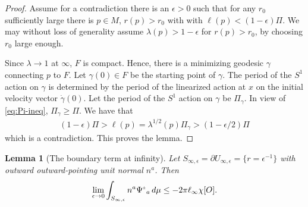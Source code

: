 \documentclass[a4paper,10pt,reqno]{amsart}
\theoremstyle{plain}
\newtheorem{lemma}[thm]{Lemma}
\newcommand{\PM}[1]{{{#1}^{\hspace{-.5pt}\scaleto{\pm}{3.5pt}}}}
\newcommand{\eps}{\epsilon}
\newcommand{\Fixed}{F}
\numberwithin{equation}{section}
\begin{document}
\begin{proof} 
Assume for a contradiction there is an $\eps > 0$ such that for any $r_0$ sufficiently large there is $p \in M$, $r(p) > r_0$ with with $\ell(p) < (1-\eps)\Pi$. We may without loss of generality assume $\lambda(p) > 1-\eps$ for $r(p) > r_0$, by choosing $r_0$ large enough. 

Since $\lambda \to 1$ at $\infty$, $\Fixed$ is compact. Hence, there is a minimizing geodesic $\gamma$ connecting $p$ to  $\Fixed$. Let $\gamma(0) \in \Fixed$ be the starting point of $\gamma$. The period of the $S^1$ action on $\gamma$ is determined by the period of the linearized action at $x$ on the initial velocity vector $\dot \gamma(0)$. Let the period of the $S^1$ action on $\gamma$ be $\Pi_\gamma$. In view of \eqref{eq:Pi-ineq}, $\Pi_\gamma \geq \Pi$. We have that 
\begin{align} 
(1-\eps) \Pi > \ell(p) =\lambda^{1/2}(p) \Pi_\gamma > (1-\eps/2)\Pi
\end{align} 
which is a contradiction. This proves the lemma.
\end{proof} 

\begin{lemma}[The boundary term at infinity] \label{lem:bdrinfty} 
Let $S_{\infty,\epsilon} = \partial U_{\infty,\epsilon} = \{ r = \eps^{-1}\}$ with outward outward-pointing unit normal $n^a$. Then
\begin{align}
\lim_{\eps \to 0}
\int_{S_{\infty,\epsilon}} n^a\PM{\Psi}_a \, d\mu
\leq -2\pi \ell_\infty \chi[O]. 
\end{align}
\end{lemma} 
\end{document}
